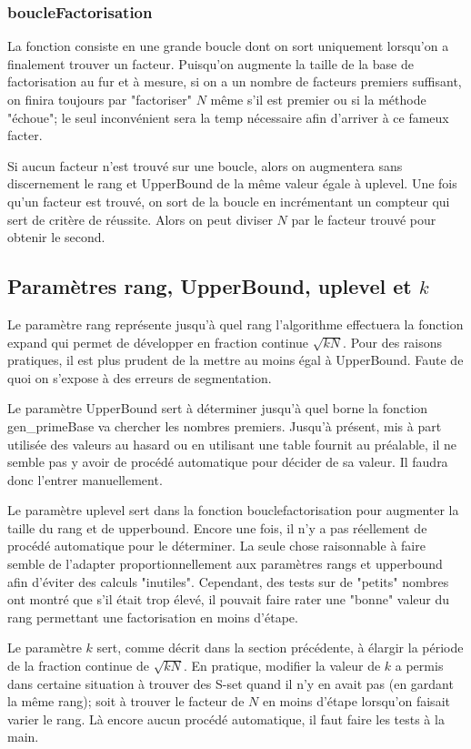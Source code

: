 \documentclass[a4paper]{article} %
\numberwithin{equation}{section}
\begin{document}
\subsubsection{boucleFactorisation}
La fonction consiste en une grande boucle dont on sort uniquement lorsqu'on a finalement trouver un facteur. Puisqu'on augmente la taille de la base de factorisation au fur et à mesure, si on a un nombre de facteurs premiers suffisant, on finira toujours par "factoriser" $N$ même s'il est premier ou si la méthode "échoue"; le seul inconvénient sera la temp nécessaire afin d'arriver à ce fameux facter.\par
Si aucun facteur n'est trouvé sur une boucle, alors on augmentera sans discernement le rang et UpperBound de la même valeur égale à uplevel. Une fois qu'un facteur est trouvé, on sort de la boucle en incrémentant un compteur qui sert de critère de réussite. Alors on peut diviser $N$ par le facteur trouvé pour obtenir le second.
\subsection{Paramètres rang, UpperBound, uplevel et $k$}
Le paramètre rang représente jusqu'à quel rang l'algorithme effectuera la fonction expand qui permet de développer en fraction continue $\sqrt{kN}$. Pour des raisons pratiques, il est plus prudent de la mettre au moins égal à UpperBound. Faute de quoi on s'expose à des erreurs de segmentation.\par
Le paramètre UpperBound sert à déterminer jusqu'à quel borne la fonction gen\_primeBase va chercher les nombres premiers. Jusqu'à présent, mis à part utilisée des valeurs au hasard ou en utilisant une table fournit au préalable, il ne semble pas y avoir de procédé automatique pour décider de sa valeur. Il faudra donc l'entrer manuellement.\par
Le paramètre uplevel sert dans la fonction bouclefactorisation pour augmenter la taille du rang et de upperbound. Encore une fois, il n'y a pas réellement de procédé automatique pour le déterminer. La seule chose raisonnable à faire semble de l'adapter proportionnellement aux paramètres rangs et upperbound afin d'éviter des calculs "inutiles". Cependant, des tests sur de "petits" nombres ont montré que s'il était trop élevé, il pouvait faire rater une "bonne" valeur du rang permettant une factorisation en moins d'étape.\par
Le paramètre $k$ sert, comme décrit dans la section précédente, à élargir la période de la fraction continue de $\sqrt{kN}$. En pratique, modifier la valeur de $k$ a permis dans certaine situation à trouver des S-set quand il n'y en avait pas (en gardant la même rang); soit à trouver le facteur de $N$ en moins d'étape lorsqu'on faisait varier le rang. Là encore aucun procédé automatique, il faut faire les tests à la main.  
\end{document}
